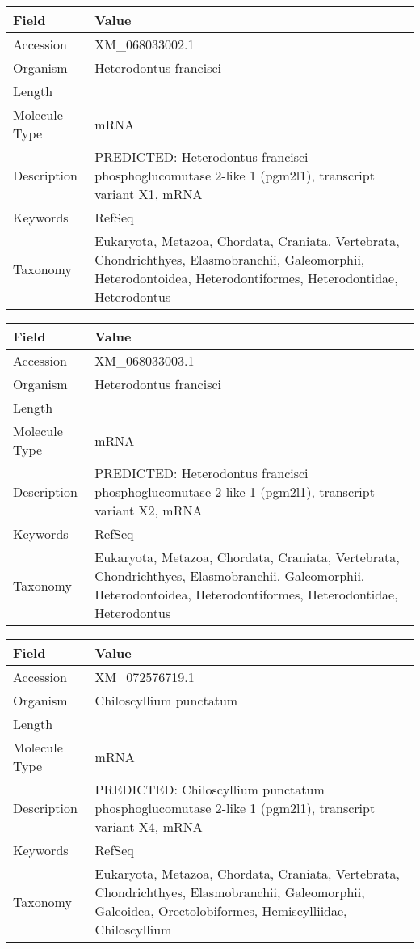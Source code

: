\documentclass[10pt]{article}
\begin{document}
\vspace{1em}
{\footnotesize
\begin{longtable}{>{\raggedright\arraybackslash}p{4.5cm} >{\raggedright\arraybackslash}p{11.5cm}}
\textbf{Field} & \textbf{Value} \\
\hline
Accession & XM\_068033002.1 \\
Organism & Heterodontus francisci \\
Length & 6560 \\
Molecule Type & mRNA \\
Description & PREDICTED: Heterodontus francisci phosphoglucomutase 2-like 1 (pgm2l1), transcript variant X1, mRNA \\
Keywords & RefSeq \\
Taxonomy & Eukaryota, Metazoa, Chordata, Craniata, Vertebrata, Chondrichthyes, Elasmobranchii, Galeomorphii, Heterodontoidea, Heterodontiformes, Heterodontidae, Heterodontus \\
\end{longtable}
}

\vspace{1em}
{\footnotesize
\begin{longtable}{>{\raggedright\arraybackslash}p{4.5cm} >{\raggedright\arraybackslash}p{11.5cm}}
\textbf{Field} & \textbf{Value} \\
\hline
Accession & XM\_068033003.1 \\
Organism & Heterodontus francisci \\
Length & 6325 \\
Molecule Type & mRNA \\
Description & PREDICTED: Heterodontus francisci phosphoglucomutase 2-like 1 (pgm2l1), transcript variant X2, mRNA \\
Keywords & RefSeq \\
Taxonomy & Eukaryota, Metazoa, Chordata, Craniata, Vertebrata, Chondrichthyes, Elasmobranchii, Galeomorphii, Heterodontoidea, Heterodontiformes, Heterodontidae, Heterodontus \\
\end{longtable}
}

\vspace{1em}
{\footnotesize
\begin{longtable}{>{\raggedright\arraybackslash}p{4.5cm} >{\raggedright\arraybackslash}p{11.5cm}}
\textbf{Field} & \textbf{Value} \\
\hline
Accession & XM\_072576719.1 \\
Organism & Chiloscyllium punctatum \\
Length & 5655 \\
Molecule Type & mRNA \\
Description & PREDICTED: Chiloscyllium punctatum phosphoglucomutase 2-like 1 (pgm2l1), transcript variant X4, mRNA \\
Keywords & RefSeq \\
Taxonomy & Eukaryota, Metazoa, Chordata, Craniata, Vertebrata, Chondrichthyes, Elasmobranchii, Galeomorphii, Galeoidea, Orectolobiformes, Hemiscylliidae, Chiloscyllium \\
\end{longtable}
}
\end{document}
